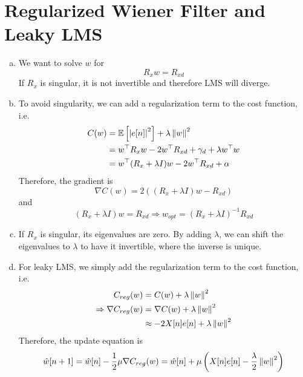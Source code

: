 \section{Regularized Wiener Filter and Leaky LMS}\label{sec:p4}

\begin{enumerate}[(a)]
\item We want to solve $w$ for \[R_x w = R_{xd}\]
If $R_x$ is singular, it is not invertible and therefore LMS will diverge.

\item To avoid singularity, we can add a regularization term to the cost function, i.e.
\begin{align*}
	C(w) 
	&= \mathbb{E} \left[ \left\lvert e[n] \right\rvert^2 \right] + \lambda\left\lVert w \right\rVert^2 \\
	&= w^\top R_x w - 2 w^\top R_{xd} + \gamma_d + \lambda w^\top w \\
	&= w^\top (R_x + \lambda I) w - 2 w^\top R_{xd} + \alpha
\end{align*}
Therefore, the gradient is
\[\nabla C(w) = 2\left((R_x + \lambda I)w - R_{xd}\right)\]
and 
\[ (R_x + \lambda I)w = R_{xd} \Rightarrow w_{opt} = (R_x + \lambda I)^{-1} R_{xd}\]

\item If $R_x$ is singular, its eigenvalues are zero. By adding $\lambda$, we can shift the eigenvalues to $\lambda$ to have it invertible, where the inverse is unique.

\item For leaky LMS, we simply add the regularization term to the cost function, i.e. 
\begin{align*}
	C_{reg}(w) &= C(w) + \lambda \left\lVert w \right\rVert^2 \\
	\Rightarrow \nabla C_{reg}(w) &= \nabla C(w) + \lambda \left\lVert w \right\rVert^2 \\
	&\approx -2X[n]e[n] + \lambda \left\lVert w \right\rVert^2
\end{align*}
Therefore, the update equation is
\[\hat{w}[n+1] = \hat{w}[n] - \frac{1}{2} \mu \nabla C_{reg}(w) = \hat{w}[n] + \mu\left(X[n]e[n] - \frac{\lambda}{2} \left\lVert w \right\rVert^2 \right)\]


\end{enumerate}
